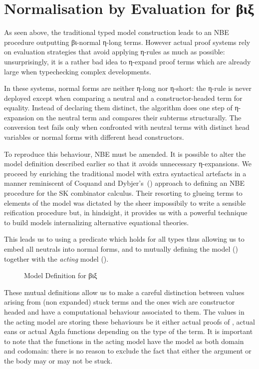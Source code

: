 \section{Normalisation by Evaluation for βιξ}

As seen above, the traditional typed model construction leads to an NBE
procedure outputting βι-normal η-long terms. However actual proof systems
rely on evaluation strategies that avoid applying η-rules
as much as possible: unsurprisingly, it is a rather bad idea to η-expand proof
terms which are already large when typechecking complex developments.

In these systems, normal forms are neither η-long nor η-short: the η-rule is
never deployed except when comparing a neutral and a constructor-headed term
for equality. Instead of declaring
them distinct, the algorithm does one step of η-expansion on the
neutral term and compares their subterms structurally. The conversion test
fails only when confronted with neutral terms with distinct head
variables or normal forms with different head constructors.

To reproduce this behaviour, NBE must be amended.
It is possible to alter the model definition described earlier so that it
avoids unnecessary η-expansions. We proceed by enriching the traditional
model with extra syntactical artefacts in a manner reminiscent of Coquand
and Dybjer's~(\citeyear{CoqDybSK}) approach to defining an NBE procedure for the SK combinator calculus. Their resorting to glueing
terms to elements of the model was dictated by the sheer impossibily to write
a sensible reification procedure but, in hindsight, it provides us with a
powerful technique to build models internalizing alternative equational
theories.

This leads us to using a predicate  which holds for all types thus allowing
us to embed all neutrals into normal forms, and to  mutually defining the model
() together with the \emph{acting} model ().

\begin{figure}[h]
\caption{Model Definition for βιξ\label{nbestuckmodel}}
\end{figure}

These mutual definitions allow us to make a careful distinction between values
arising from (non expanded) stuck terms and the ones wich are constructor headed
and have a computational behaviour associated to them. The values in the acting
model are storing these behaviours be it either actual proofs of , actual
eans or actual Agda functions depending on the type of the term. It is
important to note that the functions in the acting model have the model as both
domain and codomain: there is no reason to exclude the fact that either the argument
or the body may or may not be stuck.

